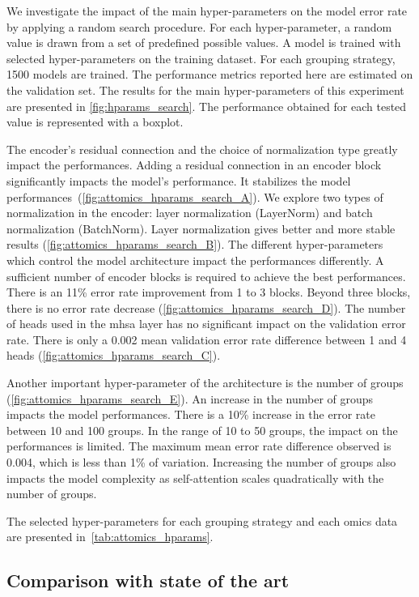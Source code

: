 \documentclass[../main.tex]{subfiles}
\begin{document}
		We investigate the impact of the main hyper-parameters on the model error rate by applying a random search procedure.
		For each hyper-parameter, a random value is drawn from a set of predefined possible values.
		A model is trained with selected hyper-parameters on the training dataset.
		For each grouping strategy, 1500 models are trained.
		The performance metrics reported here are estimated on the validation set.
		The results for the main hyper-parameters of this experiment are presented in \cref{fig:hparams_search}.
		The performance obtained for each tested value is represented with a boxplot.

		The encoder's residual connection and the choice of normalization type greatly impact the performances.
		Adding a residual connection in an encoder block significantly impacts the model's performance.
		It stabilizes the model performances~(\cref{fig:attomics_hparams_search_A}).
		We explore two types of normalization in the encoder: layer normalization (LayerNorm) and batch normalization (BatchNorm).
		Layer normalization gives better and more stable results (\cref{fig:attomics_hparams_search_B}).
		The different hyper-parameters which control the model architecture impact the performances differently.
		A sufficient number of encoder blocks is required to achieve the best performances.
		There is an 11\% error rate improvement from 1 to 3 blocks.
		Beyond three blocks, there is no error rate decrease (\cref{fig:attomics_hparams_search_D}).
		The number of heads used in the \gls{mhsa} layer has no significant impact on the validation error rate.
		There is only a 0.002 mean validation error rate difference between 1 and 4 heads (\cref{fig:attomics_hparams_search_C}).

		Another important hyper-parameter of the architecture is the number of groups (\cref{fig:attomics_hparams_search_E}).
		An increase in the number of groups impacts the model performances.
		There is a 10\% increase in the error rate between 10 and 100 groups.
		In the range of 10 to 50 groups, the impact on the performances is limited.
		The maximum mean error rate difference observed is 0.004, which is less than 1\% of variation.
		Increasing the number of groups also impacts the model complexity as self-attention scales quadratically with the number of groups.

		The selected hyper-parameters for each grouping strategy and each omics data are presented in~\cref{tab:attomics_hparams}.

	\subsection{Comparison with state of the art}
\end{document}

